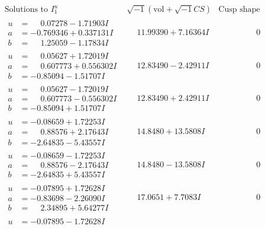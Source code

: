 \documentclass[1p]{elsarticle_modified}
\theoremstyle{definition}
\newcommand{\I}{\sqrt{-1}}
\begin{document}
$$\begin{array}{c|c|c}
\text{Solutions to }I^u_{1}& \I (\text{vol} + \sqrt{-1}CS) & \text{Cusp shape}\\
 \hline 
\begin{aligned}
u &= \phantom{-}0.07278 - 1.71903 I \\
a &= -0.769346 + 0.337131 I \\
b &= \phantom{-}1.25059 - 1.17834 I\end{aligned}
 & \phantom{-}11.99390 + 7.16364 I & \phantom{-0.000000 } 0 \\ \hline\begin{aligned}
u &= \phantom{-}0.05627 + 1.72019 I \\
a &= \phantom{-}0.607773 + 0.556302 I \\
b &= -0.85094 - 1.51707 I\end{aligned}
 & \phantom{-}12.83490 - 2.42911 I & \phantom{-0.000000 } 0 \\ \hline\begin{aligned}
u &= \phantom{-}0.05627 - 1.72019 I \\
a &= \phantom{-}0.607773 - 0.556302 I \\
b &= -0.85094 + 1.51707 I\end{aligned}
 & \phantom{-}12.83490 + 2.42911 I & \phantom{-0.000000 } 0 \\ \hline\begin{aligned}
u &= -0.08659 + 1.72253 I \\
a &= \phantom{-}0.88576 + 2.17643 I \\
b &= -2.64835 - 5.43557 I\end{aligned}
 & \phantom{-}14.8480 + 13.5808 I & \phantom{-0.000000 } 0 \\ \hline\begin{aligned}
u &= -0.08659 - 1.72253 I \\
a &= \phantom{-}0.88576 - 2.17643 I \\
b &= -2.64835 + 5.43557 I\end{aligned}
 & \phantom{-}14.8480 - 13.5808 I & \phantom{-0.000000 } 0 \\ \hline\begin{aligned}
u &= -0.07895 + 1.72628 I \\
a &= -0.83698 - 2.26090 I \\
b &= \phantom{-}2.34895 + 5.64277 I\end{aligned}
 & \phantom{-}17.0651 + 7.7083 I & \phantom{-0.000000 } 0 \\ \hline\begin{aligned}
u &= -0.07895 - 1.72628 I \\

\end{aligned}
\end{array}$$
\end{document}
